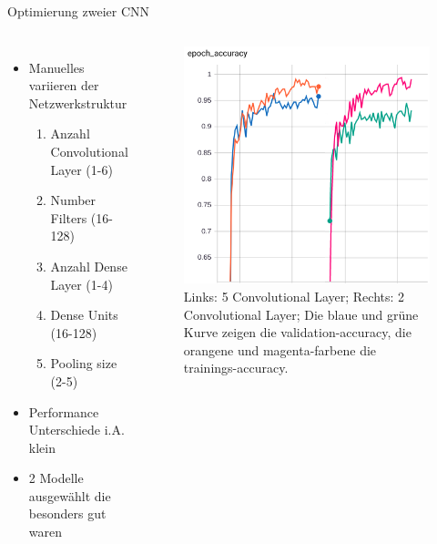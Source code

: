 \documentclass[aspectratio=1610, 9pt]{beamer}
\begin{document}
\begin{frame}{Optimierung zweier CNN}

  \begin{columns}
    \begin{itemize}
    \item Manuelles variieren der Netzwerkstruktur
      \begin{enumerate}
      \item Anzahl Convolutional Layer (1-6)
      \item Number Filters (16-128)
      \item Anzahl Dense Layer (1-4)
      \item Dense Units (16-128)
      \item Pooling size (2-5)
      \end{enumerate}
    \item Performance Unterschiede i.A. klein
    \item 2 Modelle ausgewählt die besonders gut waren
    \end{itemize}

    
    \begin{figure}
      \centering
      \includegraphics[scale=0.35]{images/models.png}      
      \caption{Links: 5 Convolutional Layer; Rechts: 2 Convolutional Layer; Die blaue und grüne Kurve zeigen die validation-accuracy, die orangene und magenta-farbene die trainings-accuracy.}
      \label{fig:acc}
    \end{figure}

  \end{columns}
\end{frame}
\end{document}

